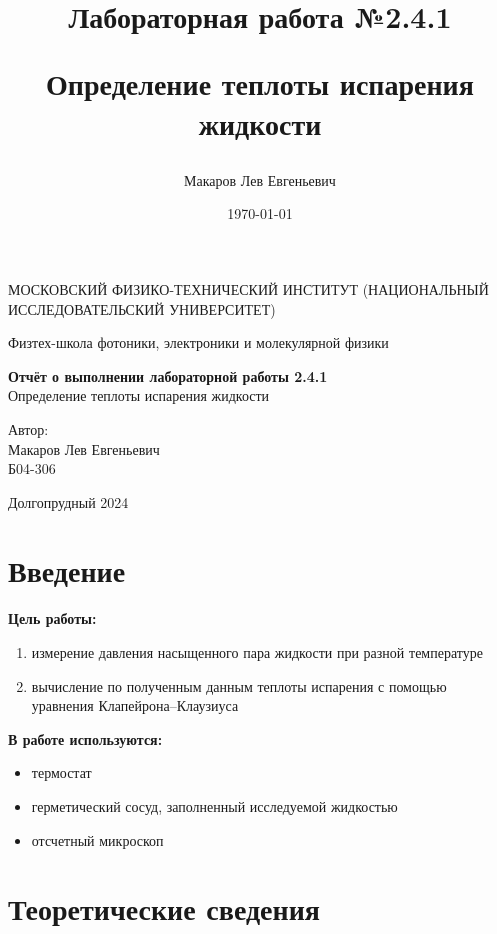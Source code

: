 \documentclass[a4paper,12pt]{article}
\author{Макаров Лев Евгеньевич}
\title{Лабораторная работа №2.4.1

Определение теплоты испарения жидкости
}
\date{\today}
\begin{document}
\begin{titlepage}
	\begin{center}
		{\large МОСКОВСКИЙ ФИЗИКО-ТЕХНИЧЕСКИЙ ИНСТИТУТ (НАЦИОНАЛЬНЫЙ ИССЛЕДОВАТЕЛЬСКИЙ УНИВЕРСИТЕТ)}
	\end{center}
	\begin{center}
		{\large Физтех-школа фотоники, электроники и молекулярной физики}
	\end{center}
	
	
	\vspace{4.5cm}
	{\huge
		\begin{center}
			{\bf Отчёт о выполнении лабораторной работы 2.4.1}\\
			Определение теплоты испарения жидкости
		\end{center}
	}
	\vspace{2cm}
	\begin{flushright}
		{\LARGE Автор:\\ Макаров Лев Евгеньевич \\
			\vspace{0.2cm}
			Б04-306}
	\end{flushright}
	\vspace{8cm}
	\begin{center}
		Долгопрудный 2024
	\end{center}
\end{titlepage}

\section{Введение}

\textbf{Цель работы:} 
\begin{enumerate}
	\item измерение давления насыщенного пара жидкости при разной температуре
    \item вычисление по полученным данным теплоты испарения с помощью уравнения Клапейрона–Клаузиуса
\end{enumerate}

\textbf{В работе используются:} 
\begin{itemize}
    \item термостат
    \item герметический сосуд, заполненный исследуемой жидкостью
    \item отсчетный микроскоп
\end{itemize}
\medskip

\section{Теоретические сведения}
  
\end{document}
